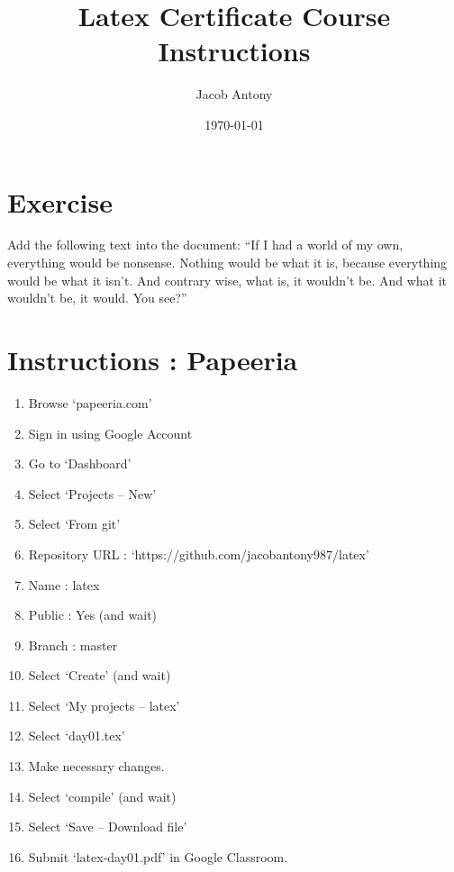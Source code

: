 \documentclass{article}
\title{Latex Certificate Course Instructions}
\author{Jacob Antony}
\date{\today}
\begin{document}
\maketitle

\section{Exercise}
	Add the following text into the document: ``If I had a world of my own, everything would be nonsense. Nothing would be what it is, because everything would be what it isn't. And contrary wise, what is, it wouldn't be. And what it wouldn't be, it would. You see?''

\section{Instructions : Papeeria}
	\begin{enumerate}
		\item Browse `papeeria.com'
		\item Sign in using Google Account
		\item Go to `Dashboard'
		\item Select `Projects -- New'
		\item Select `From git'
		\item Repository URL : `https://github.com/jacobantony987/latex'
		\item Name : latex
		\item Public : Yes (and wait)
		\item Branch : master
		\item Select `Create' (and wait)
		\item Select `My projects -- latex'
		\item Select `day01.tex'
		\item Make necessary changes.
		\item Select `compile' (and wait)
		\item Select `Save -- Download file'
		\item Submit `latex-day01.pdf' in Google Classroom.
	\end{enumerate}
\end{document}
